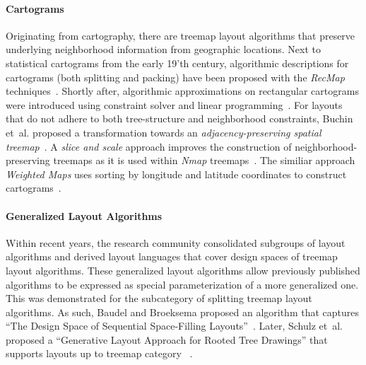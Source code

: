 \documentclass[sigconf%
,natbib=true%
]{acmart}
\begin{document}
\paragraph{\textbf{Cartograms}}
Originating from cartography, there are treemap layout algorithms that preserve underlying neighborhood information from geographic locations.
Next to statistical cartograms from the early 19'th century, algorithmic descriptions for cartograms (both splitting and packing) have been proposed with the \emph{RecMap} techniques~\cite{heilmann2004-recmap}.
Shortly after, algorithmic approximations on rectangular cartograms were introduced using constraint solver and linear programming~\cite{speckmann2006-cartograms}.
For layouts that do not adhere to both tree-structure and neighborhood constraints, Buchin et~al. proposed a transformation towards an \emph{adjacency-preserving spatial treemap}~\cite{buchin2011-adjacency}.
A \emph{slice and scale} approach improves the construction of neighborhood-preserving treemaps as it is used within \emph{Nmap} treemaps~\cite{duarte2014-nmap}.
The similiar approach \emph{Weighted Maps} uses sorting by longitude and latitude coordinates to construct cartograms~\cite{ghoniem2015-weightedmaps}.
\paragraph{\textbf{Generalized Layout Algorithms}}
Within recent years, the research community consolidated subgroups of layout algorithms and derived layout languages that cover design spaces of treemap layout algorithms.
These generalized layout algorithms allow previously published algorithms to be expressed as special parameterization of a more generalized one.
This was demonstrated for the subcategory of splitting treemap layout algorithms.
As such, Baudel and Broeksema proposed an algorithm that captures \enquote{The Design Space of Sequential Space-Filling Layouts}~\cite{baudel2012-designspace}.
Later, Schulz et~al. proposed a \enquote{Generative Layout Approach for Rooted Tree Drawings} that supports layouts up to treemap category \Tmt{}~\cite{schulz2013-generativelayout}.
\end{document}
